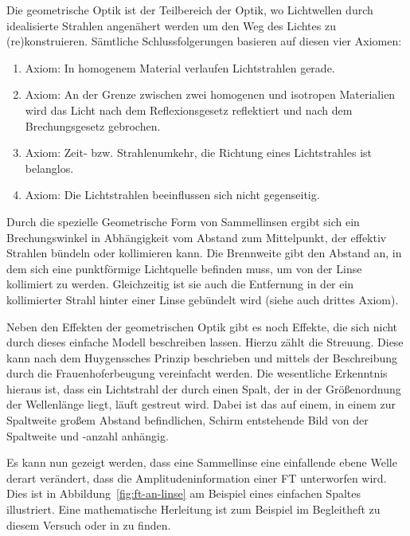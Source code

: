 
Die geometrische Optik ist der Teilbereich der Optik, wo Lichtwellen durch idealisierte Strahlen angenähert werden um den Weg des Lichtes zu (re)konstruieren. Sämtliche Schlussfolgerungen basieren auf diesen vier Axiomen:

\begin{enumerate}
	\item{Axiom:} In homogenem Material verlaufen Lichtstrahlen gerade.
	\item{Axiom:} An der Grenze zwischen zwei homogenen und isotropen Materialien wird das Licht nach dem Reflexionsgesetz reflektiert und nach dem Brechungsgesetz gebrochen.
	\item{Axiom:} Zeit- bzw. Strahlenumkehr, die Richtung eines Lichtstrahles ist belanglos.
	\item{Axiom:} Die Lichtstrahlen beeinflussen sich nicht gegenseitig.
\end{enumerate}

Durch die spezielle Geometrische Form von Sammellinsen ergibt sich ein Brechungswinkel in Abhängigkeit vom Abstand zum Mittelpunkt, der effektiv Strahlen bündeln oder kollimieren kann. Die Brennweite gibt den Abstand an, in dem sich eine punktförmige Lichtquelle befinden muss, um von der Linse kollimiert zu werden. Gleichzeitig ist sie auch die Entfernung in der ein kollimierter Strahl hinter einer Linse gebündelt wird (siehe auch drittes Axiom).

Neben den Effekten der geometrischen Optik gibt es noch Effekte, die sich nicht durch dieses einfache Modell beschreiben lassen. Hierzu zählt die Streuung. Diese kann nach dem Huygenssches Prinzip\cite{} beschrieben und mittels der Beschreibung durch die Frauenhoferbeugung\cite{} vereinfacht werden. Die wesentliche Erkenntnis hieraus ist, dass ein Lichtstrahl der durch einen Spalt, der in der Größenordnung der Wellenlänge liegt, läuft gestreut wird. Dabei ist das auf einem, in einem zur Spaltweite großem Abstand befindlichen, Schirm entstehende Bild von der Spaltweite und -anzahl anhängig.

Es kann nun gezeigt werden, dass eine Sammellinse eine einfallende ebene Welle derart verändert, dass die Amplitudeninformation einer FT unterworfen wird. Dies ist in Abbildung~\ref{fig:ft-an-linse} am Beispiel eines einfachen Spaltes illustriert. Eine mathematische Herleitung ist zum Beispiel im Begleitheft zu diesem Versuch oder in \cite{} zu finden.

